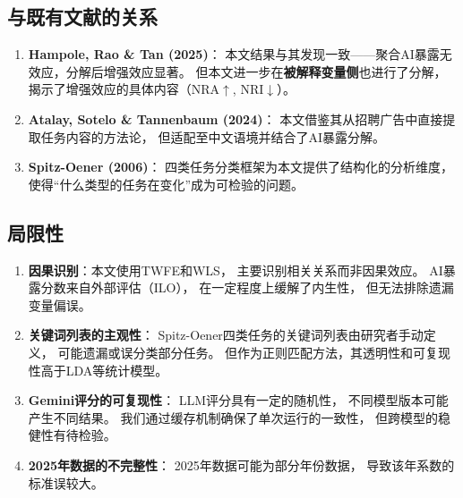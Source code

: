 \documentclass[12pt,a4paper]{ctexart}
\begin{document}
\subsection{与既有文献的关系}

\begin{enumerate}
\item \textbf{Hampole, Rao \& Tan (2025)}：
      本文结果与其发现一致——聚合AI暴露无效应，分解后增强效应显著。
      但本文进一步在\textbf{被解释变量侧}也进行了分解，
      揭示了增强效应的具体内容（NRA$\uparrow$, NRI$\downarrow$）。

\item \textbf{Atalay, Sotelo \& Tannenbaum (2024)}：
      本文借鉴其从招聘广告中直接提取任务内容的方法论，
      但适配至中文语境并结合了AI暴露分解。

\item \textbf{Spitz-Oener (2006)}：
      四类任务分类框架为本文提供了结构化的分析维度，
      使得``什么类型的任务在变化''成为可检验的问题。
\end{enumerate}

\subsection{局限性}

\begin{enumerate}
\item \textbf{因果识别}：本文使用TWFE和WLS，
      主要识别相关关系而非因果效应。
      AI暴露分数来自外部评估（ILO），
      在一定程度上缓解了内生性，
      但无法排除遗漏变量偏误。

\item \textbf{关键词列表的主观性}：
      Spitz-Oener四类任务的关键词列表由研究者手动定义，
      可能遗漏或误分类部分任务。
      但作为正则匹配方法，其透明性和可复现性高于LDA等统计模型。

\item \textbf{Gemini评分的可复现性}：
      LLM评分具有一定的随机性，
      不同模型版本可能产生不同结果。
      我们通过缓存机制确保了单次运行的一致性，
      但跨模型的稳健性有待检验。

\item \textbf{2025年数据的不完整性}：
      2025年数据可能为部分年份数据，
      导致该年系数的标准误较大。
\end{enumerate}
\end{document}
